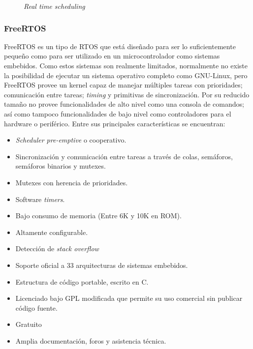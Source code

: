 \documentclass[11pt,letterpaper]{article}
\begin{document}
\begin{figure}[ht!]
\centering
{}
\caption{\textit{Real time scheduling}}\label{rtos}
\end{figure}

\subsubsection{FreeRTOS}
FreeRTOS es un tipo de \ac{RTOS} que está diseñado para ser lo suficientemente pequeño como para ser utilizado en un microcontrolador como sistemas embebidos\cite{FREERTOS}. Como estos sistemas son realmente limitados, normalmente no existe la posibilidad de ejecutar un sistema operativo completo como GNU-Linux, pero FreeRTOS provee un kernel capaz de manejar múltiples tareas con prioridades; comunicación entre tareas; \textit{timing} y primitivas de sincronización. Por su reducido tamaño no provee funcionalidades de alto nivel como una consola de comandos; así como tampoco funcionalidades de bajo nivel como controladores para el hardware o periférico. Entre sus principales características se encuentran:

\begin{itemize}
	\item \textit{Scheduler pre-emptive} o cooperativo.
	\item Sincronización y comunicación entre tareas a través de colas, semáforos, semáforos binarios y mutexes.
	\item Mutexes con herencia de prioridades.
	\item Software \textit{timers}.
	\item Bajo consumo de memoria (Entre 6K y 10K en ROM).
	\item Altamente configurable.
	\item Detección de \textit{stack overflow}
	\item Soporte oficial a 33 arquitecturas de sistemas embebidos.
	\item Estructura de código portable, escrito en C.
	\item Licenciado bajo \ac{GPL} modificada que permite su uso comercial sin publicar código fuente.
	\item Gratuito
	\item Amplia documentación, foros y asistencia técnica.
\end{itemize}
\end{document}
